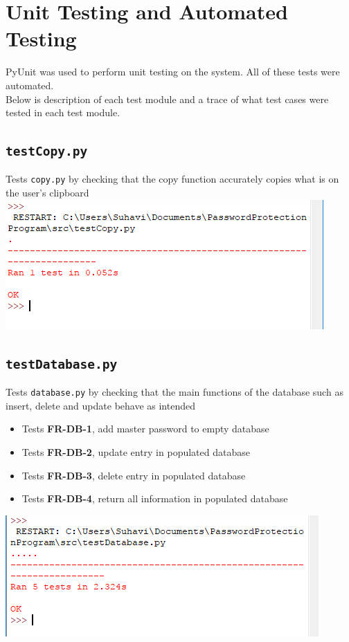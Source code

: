\documentclass[12pt, titlepage]{article}
\begin{document}
\section{Unit Testing and Automated Testing}

	PyUnit was used to perform unit testing on the system. All of these tests were automated.\\

	Below is description of each test module and a trace of what test cases were tested in each test module.

	\subsection{\texttt{testCopy.py}}

		Tests \texttt{copy.py} by checking that the copy function accurately copies what is on the user’s clipboard\\
		\includegraphics[scale=1]{testCopy.png}

	\subsection{\texttt{testDatabase.py}} 

		Tests \texttt{database.py} by checking that the main functions of the database such as insert, delete and update behave as intended

		\begin{itemize}		
			\item Tests \textbf{FR-DB-1}, add master password to empty database
			\item Tests \textbf{FR-DB-2}, update entry in populated database
			\item Tests \textbf{FR-DB-3}, delete entry in populated database
			\item Tests \textbf{FR-DB-4}, return all information in populated database
		\end{itemize}
		
		\includegraphics[scale=1]{testDatabase.png}
\end{document}

